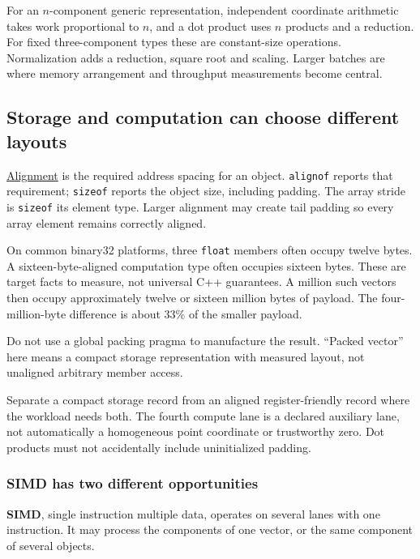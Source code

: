 For an \(n\)-component generic representation, independent coordinate arithmetic takes work proportional to \(n\), and a dot product uses \(n\) products and a reduction. For fixed three-component types these are constant-size operations. Normalization adds a reduction, square root and scaling. Larger batches are where memory arrangement and throughput measurements become central.

\subsection{Storage and computation can choose different layouts}\label{storage-and-computation-can-choose-different-layouts}

\hyperref[02-foundations-ii-ch037]{Alignment} is the required address spacing for an object. \texttt{alignof} reports that requirement; \texttt{sizeof} reports the object size, including padding. The array stride is \texttt{sizeof} its element type. Larger alignment may create tail padding so every array element remains correctly aligned.

On common binary32 platforms, three \texttt{float} members often occupy twelve bytes. A sixteen-byte-aligned computation type often occupies sixteen bytes. These are target facts to measure, not universal C++ guarantees. A million such vectors then occupy approximately twelve or sixteen million bytes of payload. The four-million-byte difference is about \(33\%\) of the smaller payload.

Do not use a global packing pragma to manufacture the result. ``Packed vector'' here means a compact storage representation with measured layout, not unaligned arbitrary member access.

Separate a compact storage record from an aligned register-friendly record where the workload needs both. The fourth compute lane is a declared auxiliary lane, not automatically a homogeneous point coordinate or trustworthy zero. Dot products must not accidentally include uninitialized padding.

\subsubsection{SIMD has two different opportunities}\label{simd-has-two-different-opportunities}

\textbf{SIMD}, single instruction multiple data, operates on several lanes with one instruction. It may process the components of one vector, or the same component of several objects.

